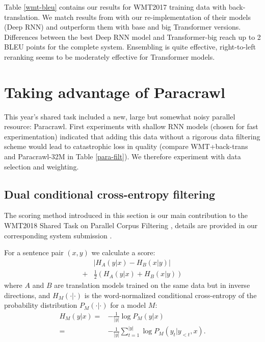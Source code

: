\documentclass[11pt,a4paper]{article}
\begin{document}
Table \ref{wmt-bleu} contains our results for WMT2017 training data with back-translation. We match results from  with our re-implementation of their models (Deep RNN) and outperform them with base and big Transformer versions. Differences between the best Deep RNN model and Transformer-big reach up to 2 BLEU points for the complete system. Ensembling is quite effective, right-to-left reranking seems to be moderately effective for Transformer models. 

\section{Taking advantage of Paracrawl}

This year's shared task included a new, large but somewhat noisy parallel resource: Paracrawl. First experiments with shallow RNN models (chosen for fast experimentation) indicated that adding this data without a rigorous data filtering scheme would lead to catastrophic loss in quality (compare WMT+back-trans and Paracrawl-32M in Table \ref{para-filt}). We therefore experiment with data selection and weighting. 

\subsection{Dual conditional cross-entropy filtering}
\label{dual}

The scoring method introduced in this section is our main contribution to the WMT2018 Shared Task on Parallel Corpus Filtering \cite{parallel-filtering-task:2018:WMT}, details are provided in our  corresponding system submission \cite{mjd-filtering}.

For a sentence pair $(x,y)$ we calculate a score:
\begin{equation}
\begin{aligned}
  & \left| H_{A}(y|x) - H_{B}(x|y) \right| \\
+ & \frac{1}{2} \left( H_{A}(y|x) + H_{B}(x|y) \right) \label{dualscore}
\end{aligned}
\end{equation}
where $A$ and $B$ are translation models trained on the same data but in inverse directions, and $H_M(\cdot|\cdot)$ is the word-normalized conditional cross-entropy of the probability distribution $P_M(\cdot|\cdot)$ for a model $M$:
\begin{equation*}
\begin{aligned}
H_M(y|x) =& -\frac{1}{|y|}\log P_M(y|x) \\
 =& -\frac{1}{|y|} \sum_{t = 1}^{|y|}\log P_M(y_t|y_{<t},x).
\end{aligned}
\end{equation*}
\end{document}
